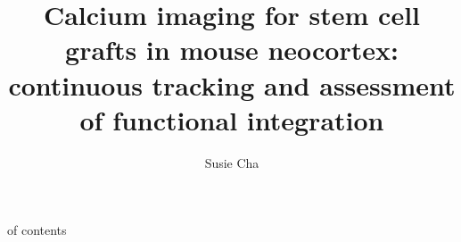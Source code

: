 \title{Calcium imaging for stem cell grafts in mouse neocortex: continuous tracking and assessment of functional integration}
\author{Susie Cha}


\maketitle
\table of contents
\